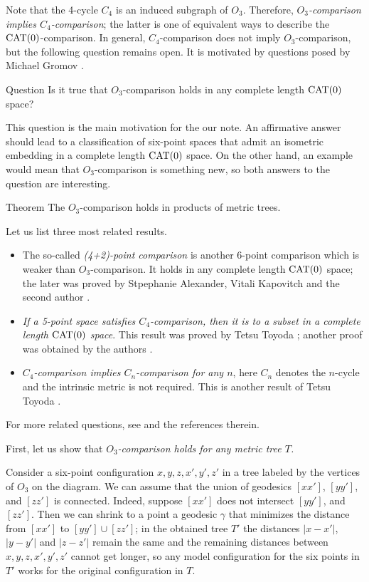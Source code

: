 \documentclass{article}
\begin{document}
Note that the 4-cycle $C_4$ is an induced subgraph of $O_3$.
Therefore, \textit{$O_3$-comparison implies $C_4$-comparison};
the latter is one of equivalent ways to describe the $\mathrm{CAT}(0)$-comparison.
In general, $C_4$-comparison does not imply $O_3$-comparison,
but the following question remains open.
It is motivated by questions posed by Michael Gromov \cite[1.19$_+(e)$]{gromov}.

\begin{thm}{Question}
Is it true that $O_3$-comparison holds in any complete length $\mathrm{CAT}(0)$ space?
\end{thm}

This question is the main motivation for the our note.
An affirmative answer should lead to a classification of six-point spaces that admit an isometric embedding in a complete length $\mathrm{CAT}(0)$ space.
On the other hand, an example would mean that $O_3$-comparison is something new,
so both answers to the question are interesting.

\begin{thm}{Theorem}
The $O_3$-comparison holds in products of metric trees.
\end{thm}

Let us list three most related results.
\begin{itemize}
\item The so-called \emph{(4+2)-point comparison} is another 6-point comparison which is weaker than $O_3$-comparison.
It holds in any complete length $\mathrm{CAT}(0)$ space;
the later was proved by Stpephanie Alexander, Vitali Kapovitch and the second author \cite{AKP-Kirszbraun,alexander2019alexandrov}.
\item \textit{If a 5-point space satisfies $C_4$-comparison, then it is to a subset in a complete length $\mathrm{CAT}(0)$ space}.
This result was proved by Tetsu Toyoda \cite{toyoda};
another proof was obtained by the authors \cite{lebedeva-petrunin}.
\item \textit{$C_4$-comparison implies $C_n$-comparison for any $n$},
here $C_n$ denotes the $n$-cycle and the intrinsic metric is not required.
This is another result of Tetsu Toyoda \cite{toyoda2019}.
\end{itemize}
For more related questions, see \cite{petrunin-2017,lebedeva-petrunin,lebedeva-petrunin-zolotov,lebedeva,lebedeva-petrunin-CBB, noar} and the references therein.

First, let us show that \textit{$O_3$-comparison holds for any metric tree $T$.}

Consider a six-point configuration $x,y,z,x',y',z'$ in a tree labeled by the vertices of $O_3$ on the diagram.
We can assume that the union of geodesics $[xx']$, $[yy']$, and $[zz']$ is connected.
Indeed, suppose $[xx']$ does not intersect $[yy']$, and $[zz']$.
Then we can shrink to a point a geodesic $\gamma$ that minimizes the distance from $[xx']$ to $[yy']\cup[zz']$;
in the obtained tree $T'$ the distances $|x-x'|$, $|y-y'|$ and $|z-z'|$ remain the same and the remaining distances between $x,y,z,x',y',z'$ cannot get longer, so any model configuration for the six points in $T'$ works for the original configuration in $T$.
\end{document}
